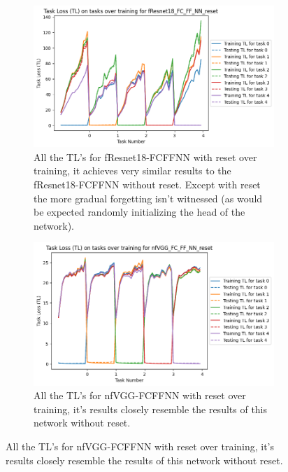 \begin{appendices}
\begin{figure}[ht]
    \begin{subfigure}[t]{0.4\textwidth}
       \includegraphics[width=\linewidth]{images/CIFAR10_CL/fResnet18_FC_FF_NN_reset_TL_task.png}
       \caption{All the TL's for fResnet18-FCFFNN with reset over training, it achieves very similar results to the fResnet18-FCFFNN without reset. Except with reset the more gradual forgetting isn't witnessed (as would be expected randomly initializing the head of the network).}
    \end{subfigure}
    \quad
    \begin{subfigure}[t]{0.4\textwidth}
      \includegraphics[width=\linewidth]{images/CIFAR10_CL/nfVGG_FC_FF_NN_reset_TL_task.png}
      \caption{All the TL's for nfVGG-FCFFNN with reset over training, it's results closely resemble the results of this network without reset.}
   \end{subfigure}
   
   \medskip %
  

\end{figure}
\end{appendices}
